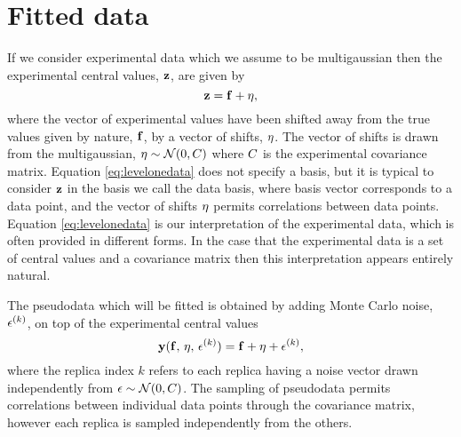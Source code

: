 \section{Fitted data}
If we consider experimental data which we assume
to be multigaussian then the experimental central values,
$\mathbf{z}$, are given by
\begin{equation}\label{eq:levelonedata}
    \mathbf{z} = \mathbf{f} + \mathbf{\eta},
\end{equation}
where the vector of experimental values have been shifted away from
the true values given by nature, $\mathbf{f}$, by a vector of shifts,
$\mathbf{\eta}$. The vector of shifts
is drawn from
the multigaussian, $\mathbf{\eta} \sim \mathcal{N}(0, C)$ where $C$ is the
experimental covariance matrix. Equation \eqref{eq:levelonedata} does not specify
a basis, but it is typical to consider $\mathbf{z}$ in the basis we call the
data basis, where basis vector corresponds to a data point, and the vector of
shifts $\mathbf{\eta}$ permits correlations between data points.
Equation \eqref{eq:levelonedata} is our interpretation of the
experimental data, which is often provided in different forms. In the case that
the experimental data is a set of central values and a covariance matrix then
this interpretation appears entirely natural.

The pseudodata which will be fitted is obtained by adding Monte Carlo
noise, $\epsilon^{(k)}$, on top of the experimental central values
\begin{equation}\label{eq:leveltwodata1}
    \mathbf{y}(\mathbf{f},\,\mathbf{\eta},\,\mathbf{\epsilon}^{(k)})
    = \mathbf{f} + \mathbf{\eta} + \mathbf{\epsilon}^{(k)},
\end{equation}
where the replica index $k$ refers to each replica having a noise vector drawn
independently from $\mathbf{\epsilon} \sim \mathcal{N}(0, C)$. The sampling of
pseudodata permits correlations between individual data points through the
covariance matrix, however each replica is sampled independently from the others.

